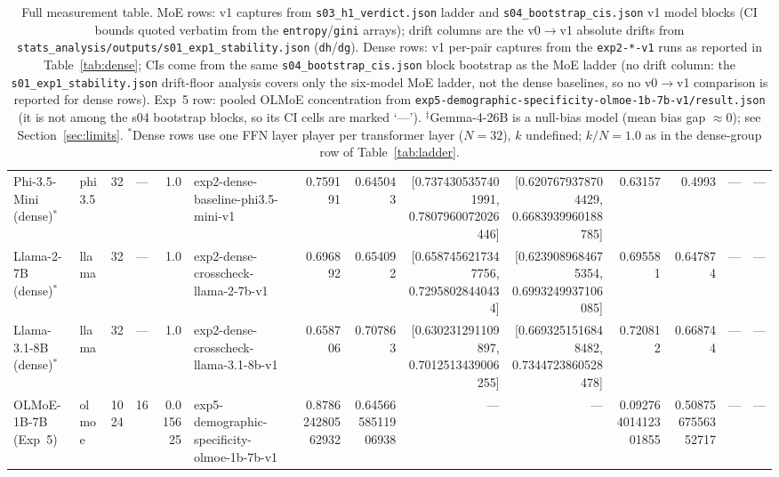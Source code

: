 \documentclass[sigconf]{acmart}
\begin{document}
\begin{table}[ht]
{\begin{tabular}{llrrrlrrrrrrrl}
Phi-3.5-Mini (dense)$^{*}$ & phi3.5 & 32 & --- & 1.0 & exp2-dense-baseline-phi3.5-mini-v1 & 0.759191 & 0.645043 & [0.7374305357401991, 0.7807960072026446] & [0.6207679378704429, 0.6683939960188785] & 0.63157 & 0.4993 & --- & --- \\
Llama-2-7B (dense)$^{*}$ & llama & 32 & --- & 1.0 & exp2-dense-crosscheck-llama-2-7b-v1 & 0.696892 & 0.654092 & [0.6587456217347756, 0.72958028440434] & [0.6239089684675354, 0.6993249937106085] & 0.695581 & 0.647874 & --- & --- \\
Llama-3.1-8B (dense)$^{*}$ & llama & 32 & --- & 1.0 & exp2-dense-crosscheck-llama-3.1-8b-v1 & 0.658706 & 0.707863 & [0.630231291109897, 0.7012513439006255] & [0.6693251516848482, 0.7344723860528478] & 0.720812 & 0.668744 & --- & --- \\
\midrule
OLMoE-1B-7B (Exp~5) & olmoe & 1024 & 16 & 0.015625 & exp5-demographic-specificity-olmoe-1b-7b-v1 & 0.878624280562932 & 0.6456658511906938 & --- & --- & 0.09276401412301855 & 0.5087567556352717 & --- & --- \\
\bottomrule
\end{tabular}}
\caption{Full measurement table. MoE rows: v1 captures from
\texttt{s03\_h1\_verdict.json} ladder and \texttt{s04\_bootstrap\_cis.json}
v1 model blocks (CI bounds quoted verbatim from the
\texttt{entropy}/\texttt{gini} arrays); drift columns are the
v0$\rightarrow$v1 absolute drifts from
\texttt{stats\_analysis/outputs/s01\_exp1\_stability.json}
(\texttt{dh}/\texttt{dg}). Dense rows: v1 per-pair captures from
the \texttt{exp2-*-v1} runs as reported in Table~\ref{tab:dense}; CIs come
from the same \texttt{s04\_bootstrap\_cis.json} block bootstrap as the MoE
ladder (no drift column: the \texttt{s01\_exp1\_stability.json}
drift-floor analysis covers only the six-model MoE ladder, not the dense baselines, so no v0$\rightarrow$v1 comparison is reported for dense rows). Exp~5
row: pooled OLMoE concentration from
\texttt{exp5-demographic-specificity-olmoe-1b-7b-v1/result.json}
(it is not among the s04 bootstrap blocks, so its CI cells are marked
`---'). $^{\ddagger}$Gemma-4-26B is a null-bias model (mean bias gap
$\approx 0$); see Section~\ref{sec:limits}. $^{*}$Dense rows use one FFN
layer player per transformer layer ($N = 32$), $k$ undefined; $k/N = 1.0$ as
in the dense-group row of Table~\ref{tab:ladder}.}
\label{tab:appendix-full}
\end{table}
\end{document}
